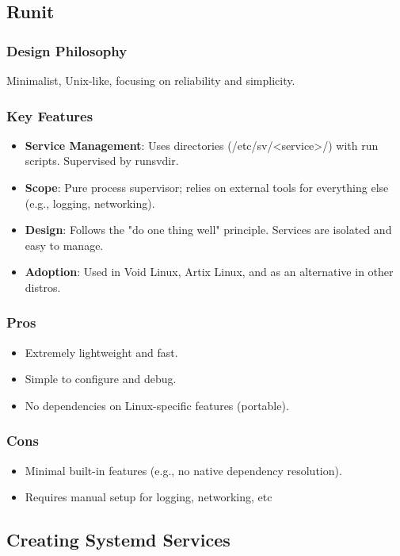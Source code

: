 \subsection{Runit}

\subsubsection{Design Philosophy}
Minimalist, Unix-like, focusing on reliability and simplicity.

\subsubsection{Key Features}
\begin{itemize}
\item \textbf{Service Management}: Uses directories (/etc/sv/<service>/) with run scripts. Supervised by runsvdir.
\item \textbf{Scope}: Pure process supervisor; relies on external tools for everything else (e.g., logging, networking).
\item \textbf{Design}: Follows the "do one thing well" principle. Services are isolated and easy to manage.
\item \textbf{Adoption}: Used in Void Linux, Artix Linux, and as an alternative in other distros.
\end{itemize}


\subsubsection{Pros}
\begin{itemize}
\item Extremely lightweight and fast.
\item Simple to configure and debug.
\item No dependencies on Linux-specific features (portable).
\end{itemize}


\subsubsection{Cons}
\begin{itemize}
\item Minimal built-in features (e.g., no native dependency resolution).
\item Requires manual setup for logging, networking, etc
\end{itemize}


\subsection{Creating Systemd Services}

